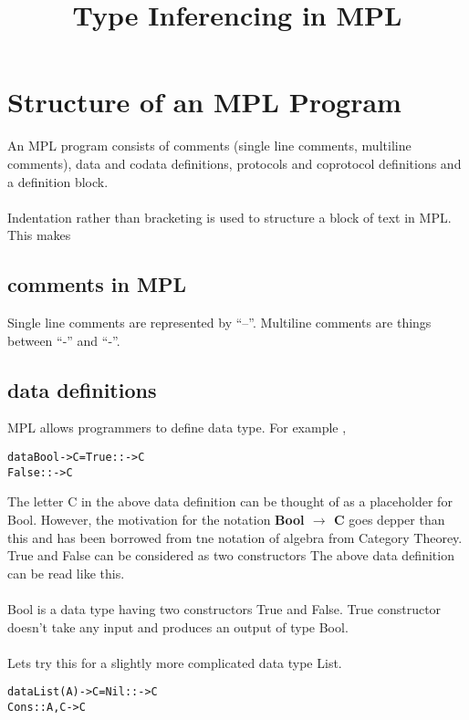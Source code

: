 \documentclass[11pt]{article}
\title{Type Inferencing in MPL}
\begin{document}
\maketitle
\section {Structure of an MPL Program}
An MPL program consists of comments (single line comments, multiline comments), data and codata definitions, protocols and coprotocol definitions and a definition block.
~~\\~~\\ 
Indentation rather than bracketing is used to structure a block of text in MPL. This makes 
\subsection {comments in MPL}
Single line comments are represented by ``--''. Multiline comments are things between ``{-'' and  ``-}''.

\subsection {data definitions}
MPL allows programmers to define data type. For example ,

\begin{alltt}
                data Bool -> C = True  ::  -> C  
                                 False ::  -> C   
\end{alltt}

The letter C in the above data definition can be thought of as a placeholder for Bool. However, the motivation for the notation {\bf Bool $\to$ C} goes depper than this and has been borrowed from tne notation of algebra from Category Theorey. True and False can be considered as two constructors  The above data definition can be read like this. 
~~\\~~\\
Bool is a data type having two constructors True and False. True constructor doesn't take any input and produces an output of type Bool. 
~~\\~~\\ 
Lets try this for a slightly more complicated data type List. 

\begin{alltt}
                data List(A) -> C = Nil  ::     -> C  
                                    Cons :: A,C -> C   
\end{alltt}
\end{document}
